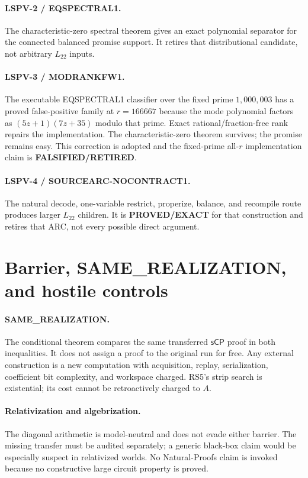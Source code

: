 \documentclass[11pt]{article}
\newcommand{\Ltwo}{L_{22}}
\newcommand{\sCP}{\mathsf{sCP}}
\newcommand{\EXACT}{\textbf{PROVED/EXACT}}
\newcommand{\RET}{\textbf{FALSIFIED/RETIRED}}
\begin{document}
\paragraph{LSPV-2 / EQSPECTRAL1.}
The characteristic-zero spectral theorem gives an exact polynomial separator
for the connected balanced promise support. It retires that distributional
candidate, not arbitrary $\Ltwo$ inputs.

\paragraph{LSPV-3 / MODRANKFW1.}
The executable EQSPECTRAL1 classifier over the fixed prime $1{,}000{,}003$
has a proved false-positive family at $r=166667$ because the mode polynomial
factors as $(5z+1)(7z+35)$ modulo that prime. Exact rational/fraction-free
rank repairs the implementation. The characteristic-zero theorem survives;
the promise remains easy. This correction is adopted and the fixed-prime
all-$r$ implementation claim is \RET{}.

\paragraph{LSPV-4 / SOURCEARC-NOCONTRACT1.}
The natural decode, one-variable restrict, properize, balance, and recompile
route produces larger $\Ltwo$ children. It is \EXACT{} for that construction
and retires that ARC, not every possible direct argument.

\section{Barrier, SAME\_REALIZATION, and hostile controls}
\paragraph{SAME\_REALIZATION.}
The conditional theorem compares the same transferred $\sCP$ proof in both
inequalities. It does not assign a proof to the original run for free.
Any external construction is a new computation with acquisition, replay,
serialization, coefficient bit complexity, and workspace charged. RS5's
strip search is existential; its cost cannot be retroactively charged to
$A$.

\paragraph{Relativization and algebrization.}
The diagonal arithmetic is model-neutral and does not evade either barrier.
The missing transfer must be audited separately; a generic black-box claim
would be especially suspect in relativized worlds. No Natural-Proofs claim
is invoked because no constructive large circuit property is proved.
\end{document}
